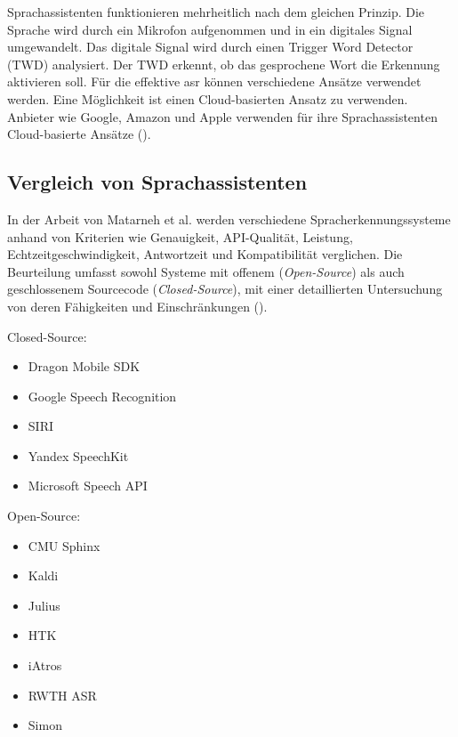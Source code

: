 \documentclass[11pt,a4paper]{article}
\begin{document}
\noindent \newline
Sprachassistenten funktionieren mehrheitlich nach dem gleichen Prinzip. Die Sprache wird
durch ein Mikrofon aufgenommen und in ein digitales Signal umgewandelt. Das digitale Signal wird
durch einen Trigger Word Detector (TWD) analysiert. Der TWD erkennt, ob das gesprochene Wort die 
Erkennung aktivieren soll. Für die effektive \gls{asr} können verschiedene Ansätze verwendet
werden. Eine Möglichkeit ist einen Cloud-basierten Ansatz zu verwenden. Anbieter wie Google,
Amazon und Apple verwenden für ihre Sprachassistenten Cloud-basierte Ansätze 
(\cite{matarneh2017speechrecognition}). 

\subsection{Vergleich von Sprachassistenten}\label{sec:vergleich_sprachassistenten}

In der Arbeit von Matarneh et al. werden verschiedene Spracherkennungssysteme anhand von Kriterien 
wie Genauigkeit, API-Qualität, Leistung, Echtzeitgeschwindigkeit, Antwortzeit und Kompatibilität 
verglichen. Die Beurteilung umfasst sowohl Systeme mit offenem (\textit{Open-Source}) als auch 
geschlossenem Sourcecode (\textit{Closed-Source}), mit einer detaillierten Untersuchung von deren 
Fähigkeiten und Einschränkungen (\cite{matarneh2017speechrecognition}).

\raggedcolumns
\begin{multicols}{2}
	\small 
	\setlength\itemsep{0em} 
	
	\noindent Closed-Source:
	\begin{itemize}[itemsep=0px, parsep=0px]
	\item Dragon Mobile SDK
	\item Google Speech Recognition
	\item SIRI
	\item Yandex SpeechKit
	\item Microsoft Speech API
	\end{itemize}
	
	\columnbreak
	
	\noindent Open-Source:
	\begin{itemize}[itemsep=0px, parsep=0px]
	\item CMU Sphinx
	\item Kaldi
	\item Julius
	\item HTK
	\item iAtros
	\item RWTH ASR
	\item Simon
	\end{itemize}
\end{multicols}
	
\end{document}
